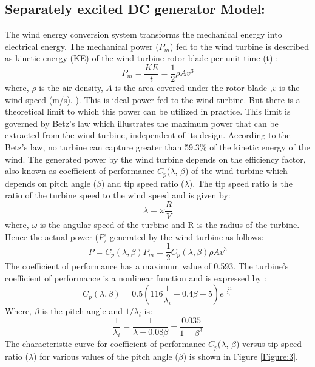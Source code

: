 \subsection{Separately excited DC generator Model:}
The wind energy conversion system transforms the mechanical energy into electrical energy. The mechanical power $(P_m$) fed to the wind turbine is described as kinetic energy (KE) of the wind turbine rotor blade per unit time (t) \cite{RefJ8} :
\begin{equation} \label{eq:1}
P_m =\frac{KE}{t} = \frac{1}{2} \rho  Av^3
\end{equation}
where, $\rho$ is the air density, $A$ is the area covered under the rotor blade ,$v$ is the wind speed (m/s). ). This is ideal power fed to the wind turbine. But there is a theoretical limit to which this power can be utilized in practice. This limit is governed by Betz’s law\cite{RefJ9} which illustrates the maximum power that can be extracted from the wind turbine, independent of its design. According to the Betz's law, no turbine can capture greater than 59.3\% of the kinetic energy of the wind. The generated power by the wind turbine depends on the efficiency factor, also known as coefficient of  performance  $C_p$($\lambda$, $\beta$) of the wind turbine which depends on pitch angle ($\beta$) and tip speed ratio ($\lambda$). The tip speed ratio is the ratio of  the turbine speed to the wind speed and is given by:
\begin{equation} \label{eq:2}
\lambda=\omega \frac{R}{V}
\end{equation}
where, $\omega$  is the angular speed of the turbine and R is the radius of the turbine. Hence the actual power ($P$) generated by the wind turbine as follows:
\begin{equation} \label{eq:3}
P=C_p(\lambda,\beta)P_m = \frac{1}{2}C_p(\lambda,\beta) \rho  Av^3
\end{equation}
The coefficient of  performance has a maximum value of 0.593. The turbine’s coefficient of performance is a nonlinear function and is expressed by \cite{RefJ10}:
\begin{equation} \label{eq:4}
C_p(\lambda,\beta) = 0.5 ( 116 \frac{1}{\lambda_i} - 0.4 \beta - 5) e^\frac{-21}{\lambda_i}
\end{equation}
Where, $\beta$ is the pitch angle and $1/\lambda_i$ is: 
\begin{equation} \label{eq:5}
\frac{1}{\lambda_i} = \frac {1}{\lambda + 0.08 \beta} - \frac{0.035}{1+\beta^3}
\end{equation}
The characteristic curve for coefficient of  performance $C_p$($\lambda$, $\beta$) versus tip speed ratio ($\lambda$) for various values of the pitch angle ($\beta$) is shown in Figure \ref{Figure:3}.
